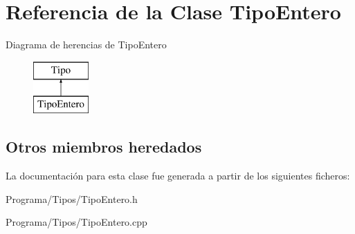 \hypertarget{class_tipo_entero}{\section{Referencia de la Clase Tipo\-Entero}
\label{class_tipo_entero}
}
Diagrama de herencias de Tipo\-Entero\begin{figure}[H]
\begin{center}
\leavevmode
\includegraphics[height=2.000000cm]{class_tipo_entero}
\end{center}
\end{figure}
\subsection*{Otros miembros heredados}


La documentación para esta clase fue generada a partir de los siguientes ficheros\-:\begin{DoxyCompactItemize}
\item 
Programa/\-Tipos/Tipo\-Entero.\-h\item 
Programa/\-Tipos/Tipo\-Entero.\-cpp\end{DoxyCompactItemize}
